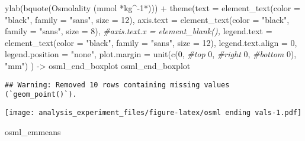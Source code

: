 \documentclass[
]{article}
\newenvironment{Shaded}{\begin{snugshade}}{\end{snugshade}}
\newcommand{\AttributeTok}[1]{\textcolor[rgb]{0.77,0.63,0.00}{#1}}
\newcommand{\CommentTok}[1]{\textcolor[rgb]{0.56,0.35,0.01}{\textit{#1}}}
\newcommand{\DecValTok}[1]{\textcolor[rgb]{0.00,0.00,0.81}{#1}}
\newcommand{\FunctionTok}[1]{\textcolor[rgb]{0.00,0.00,0.00}{#1}}
\newcommand{\NormalTok}[1]{#1}
\newcommand{\OtherTok}[1]{\textcolor[rgb]{0.56,0.35,0.01}{#1}}
\newcommand{\SpecialCharTok}[1]{\textcolor[rgb]{0.00,0.00,0.00}{#1}}
\newcommand{\StringTok}[1]{\textcolor[rgb]{0.31,0.60,0.02}{#1}}
\begin{document}
\begin{Shaded}
\begin{Highlighting}[]
  \FunctionTok{ylab}\NormalTok{(}\FunctionTok{bquote}\NormalTok{(}\StringTok{\textquotesingle{}Osmolality (mmol \textquotesingle{}}\SpecialCharTok{*}\NormalTok{kg}\SpecialCharTok{\^{}{-}}\DecValTok{1}\SpecialCharTok{*}\StringTok{\textquotesingle{})\textquotesingle{}}\NormalTok{)) }\SpecialCharTok{+} 
  \FunctionTok{theme}\NormalTok{(}\AttributeTok{text =} \FunctionTok{element\_text}\NormalTok{(}\AttributeTok{color =} \StringTok{"black"}\NormalTok{, }
                            \AttributeTok{family =} \StringTok{"sans"}\NormalTok{, }
                            \AttributeTok{size =} \DecValTok{12}\NormalTok{),}
        \AttributeTok{axis.text =} \FunctionTok{element\_text}\NormalTok{(}\AttributeTok{color =} \StringTok{"black"}\NormalTok{, }
                                 \AttributeTok{family =} \StringTok{"sans"}\NormalTok{, }
                                 \AttributeTok{size =} \DecValTok{8}\NormalTok{),}
        \CommentTok{\#axis.text.x = element\_blank(),}
        \AttributeTok{legend.text =} \FunctionTok{element\_text}\NormalTok{(}\AttributeTok{color =} \StringTok{"black"}\NormalTok{, }
                                 \AttributeTok{family =} \StringTok{"sans"}\NormalTok{, }
                                 \AttributeTok{size =} \DecValTok{12}\NormalTok{),}
        \AttributeTok{legend.text.align =} \DecValTok{0}\NormalTok{,}
        \AttributeTok{legend.position =} \StringTok{"none"}\NormalTok{,}
        \AttributeTok{plot.margin =} \FunctionTok{unit}\NormalTok{(}\FunctionTok{c}\NormalTok{(}\DecValTok{0}\NormalTok{, }\CommentTok{\#top}
                              \DecValTok{0}\NormalTok{, }\CommentTok{\#right}
                              \DecValTok{0}\NormalTok{, }\CommentTok{\#bottom}
                              \DecValTok{0}\NormalTok{), }\StringTok{"mm"}\NormalTok{)}
\NormalTok{        ) }\OtherTok{{-}\textgreater{}}\NormalTok{ osml\_end\_boxplot}
\NormalTok{osml\_end\_boxplot}
\end{Highlighting}
\end{Shaded}

\begin{verbatim}
## Warning: Removed 10 rows containing missing values (`geom_point()`).
\end{verbatim}

\texttt{[image: analysis\_experiment\_files/figure-latex/osml ending vals-1.pdf]}

\begin{Shaded}
\begin{Highlighting}[]
\NormalTok{osml\_emmeans}
\end{Highlighting}
\end{Shaded}
\end{document}
